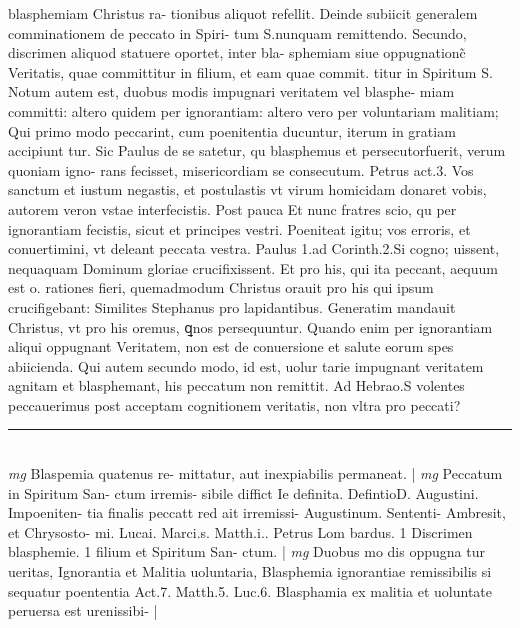 \documentclass{article}
\begin{document}
\begin{pages}
blasphemiam Christus ra- tionibus aliquot refellit. Deinde subiicit generalem comminationem de peccato in Spiri- tum S.nunquam remittendo. Secundo, discrimen aliquod statuere oportet, inter bla- sphemiam siue oppugnationc̃ Veritatis, quae committitur in filium, et eam quae commit. titur in Spiritum S. Notum autem est, duobus modis impugnari veritatem vel blasphe- miam committi: altero quidem per ignorantiam: altero vero per voluntariam malitiam; Qui primo modo peccarint, cum poenitentia ducuntur, iterum in gratiam accipiunt tur. Sic Paulus de se satetur, qu blasphemus et persecutorfuerit, verum quoniam igno- rans fecisset, misericordiam se consecutum. Petrus act.3. Vos sanctum et iustum negastis, et postulastis vt virum homicidam donaret vobis, autorem veron vstae interfecistis. Post pauca Et nunc fratres scio, qu per ignorantiam fecistis, sicut et principes vestri. Poeniteat igitu; vos erroris, et conuertimini, vt deleant peccata vestra. Paulus 1.ad Corinth.2.Si cogno; uissent, nequaquam Dominum gloriae crucifixissent. Et pro his, qui ita peccant, aequum est o. rationes fieri, quemadmodum Christus orauit pro his qui ipsum crucifigebant: Similites Stephanus pro lapidantibus. Generatim mandauit Christus, vt pro his oremus, ꝗnos persequuntur. Quando enim per ignorantiam aliqui oppugnant Veritatem, non est de conuersione et salute eorum spes abiicienda. Qui autem secundo modo, id est, uolur tarie impugnant veritatem agnitam et blasphemant, his peccatum non remittit. Ad Hebrao.S volentes peccauerimus post acceptam cognitionem veritatis, non vltra pro peccati?  \pend
\vspace{0.5cm}\noindent
\vspace{0.2cm}\rule{1cm}{0.2pt}\\ 
\hspace{0.2cm}\textit{mg}
\footnotesize Blaspemia quatenus re- mittatur, aut inexpiabilis permaneat. 
\normalsize| 
\hspace{0.2cm}\textit{mg}
\footnotesize Peccatum in Spiritum San- ctum irremis- sibile diffict Ie definita. DefintioD. Augustini. Impoeniten- tia finalis peccatt red ait irremissi-  Augustinum. Sententi- Ambresit, et Chrysosto- mi. Lucai. Marci.s. Matth.i.. Petrus Lom bardus. 1 Discrimen blasphemie. 1 filium et Spiritum San- ctum. 
\normalsize| 
\hspace{0.2cm}\textit{mg}
\footnotesize Duobus mo dis oppugna tur ueritas, Ignorantia et Malitia uoluntaria, Blasphemia ignorantiae remissibilis si sequatur poententia Act.7. Matth.5. Luc.6. Blasphamia ex malitia et uoluntate peruersa est urenissibi- 
\normalsize| 

\end{pages}
\end{document}
